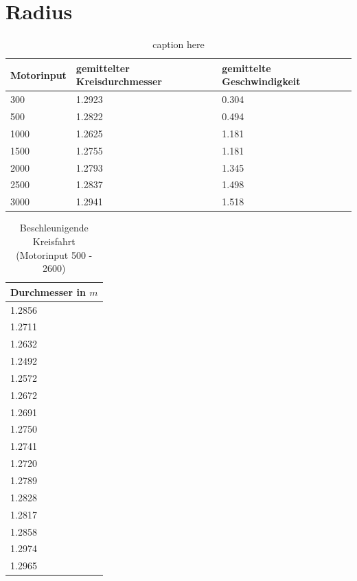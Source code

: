 \documentclass[10pt]{article}
\begin{document}
\section{Radius}
    \begin{table}[tb]
        \caption{caption here}
        \label{tab:radius_table1}
        \centering
        \begin{tabular}{|l|l|l|}
        Motorinput & gemittelter Kreisdurchmesser & gemittelte Geschwindigkeit \\ \hline
        300        & 1.2923                       & 0.304                      \\
        500        & 1.2822                       & 0.494                      \\
        1000       & 1.2625                       & 1.181                      \\
        1500       & 1.2755                       & 1.181                      \\
        2000       & 1.2793                       & 1.345                      \\
        2500       & 1.2837                       & 1.498                      \\
        3000       & 1.2941                       & 1.518
        \end{tabular}
    \end{table}
\begin{table}
        \caption{Beschleunigende Kreisfahrt (Motorinput 500 - 2600)}
        \label{tab:beschleunigende_kreisfahrt}
        \centering
        \begin{tabular}{|l}
        Durchmesser in $m$ \\\hline
        1.2856                 \\
        1.2711                 \\
        1.2632                 \\
        1.2492                 \\
        1.2572                 \\
        1.2672                 \\
        1.2691                 \\
        1.2750                 \\
        1.2741                 \\
        1.2720                 \\
        1.2789                 \\
        1.2828                 \\
        1.2817                 \\
        1.2858                 \\
        1.2974                 \\
        1.2965
        \end{tabular}
    \end{table}
\end{document}
